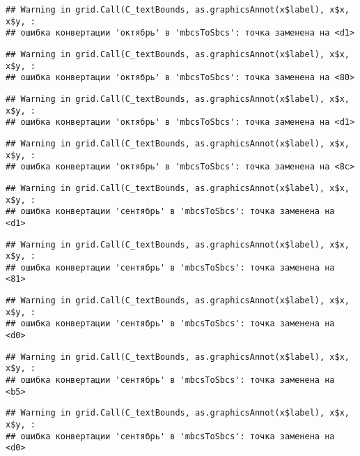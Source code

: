 \documentclass[
]{article}
\begin{document}
\begin{verbatim}
## Warning in grid.Call(C_textBounds, as.graphicsAnnot(x$label), x$x, x$y, :
## ошибка конвертации 'октябрь' в 'mbcsToSbcs': точка заменена на <d1>
\end{verbatim}

\begin{verbatim}
## Warning in grid.Call(C_textBounds, as.graphicsAnnot(x$label), x$x, x$y, :
## ошибка конвертации 'октябрь' в 'mbcsToSbcs': точка заменена на <80>
\end{verbatim}

\begin{verbatim}
## Warning in grid.Call(C_textBounds, as.graphicsAnnot(x$label), x$x, x$y, :
## ошибка конвертации 'октябрь' в 'mbcsToSbcs': точка заменена на <d1>
\end{verbatim}

\begin{verbatim}
## Warning in grid.Call(C_textBounds, as.graphicsAnnot(x$label), x$x, x$y, :
## ошибка конвертации 'октябрь' в 'mbcsToSbcs': точка заменена на <8c>
\end{verbatim}

\begin{verbatim}
## Warning in grid.Call(C_textBounds, as.graphicsAnnot(x$label), x$x, x$y, :
## ошибка конвертации 'сентябрь' в 'mbcsToSbcs': точка заменена на <d1>
\end{verbatim}

\begin{verbatim}
## Warning in grid.Call(C_textBounds, as.graphicsAnnot(x$label), x$x, x$y, :
## ошибка конвертации 'сентябрь' в 'mbcsToSbcs': точка заменена на <81>
\end{verbatim}

\begin{verbatim}
## Warning in grid.Call(C_textBounds, as.graphicsAnnot(x$label), x$x, x$y, :
## ошибка конвертации 'сентябрь' в 'mbcsToSbcs': точка заменена на <d0>
\end{verbatim}

\begin{verbatim}
## Warning in grid.Call(C_textBounds, as.graphicsAnnot(x$label), x$x, x$y, :
## ошибка конвертации 'сентябрь' в 'mbcsToSbcs': точка заменена на <b5>
\end{verbatim}

\begin{verbatim}
## Warning in grid.Call(C_textBounds, as.graphicsAnnot(x$label), x$x, x$y, :
## ошибка конвертации 'сентябрь' в 'mbcsToSbcs': точка заменена на <d0>
\end{verbatim}
\end{document}
